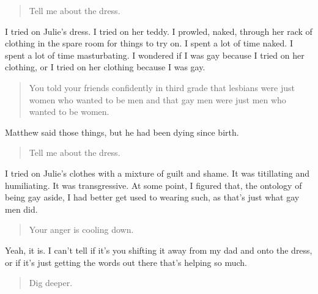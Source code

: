 \begin{quote}
Tell me about the dress.
\end{quote}

I tried on Julie's dress. I tried on her teddy. I prowled, naked, through her rack of clothing in the spare room for things to try on. I spent a lot of time naked. I spent a lot of time masturbating. I wondered if I was gay because I tried on her clothing, or I tried on her clothing because I was gay.

\begin{quote}
You told your friends confidently in third grade that lesbians were just women who wanted to be men and that gay men were just men who wanted to be women.
\end{quote}

Matthew said those things, but he had been dying since birth.

\begin{quote}
Tell me about the dress.
\end{quote}

I tried on Julie's clothes with a mixture of guilt and shame. It was titillating and humiliating. It was transgressive. At some point, I figured that, the ontology of being gay aside, I had better get used to wearing such, as that's just what gay men did.

\begin{quote}
Your anger is cooling down.
\end{quote}

Yeah, it is. I can't tell if it's you shifting it away from my dad and onto the dress, or if it's just getting the words out there that's helping so much.

\begin{quote}
Dig deeper.
\end{quote}
